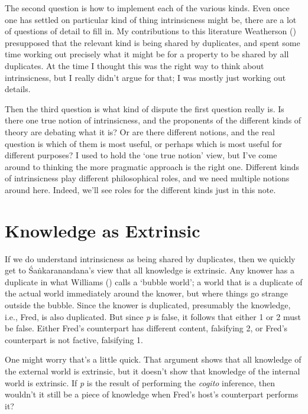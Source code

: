 \documentclass[
  11pt,
  letterpaper,
  DIV=11,
  numbers=noendperiod,
  twoside]{scrartcl}
\begin{document}
The second question is how to implement each of the various kinds. Even
once one has settled on particular kind of thing intrinsicness might be,
there are a lot of questions of detail to fill in. My contributions to
this literature Weatherson ()
presupposed that the relevant kind is being shared by duplicates, and
spent some time working out precisely what it might be for a property to
be shared by all duplicates. At the time I thought this was the right
way to think about intrinsicness, but I really didn't argue for that; I
was mostly just working out details.

Then the third question is what kind of dispute the first question
really is. Is there one true notion of intrinsicness, and the proponents
of the different kinds of theory are debating what it is? Or are there
different notions, and the real question is which of them is most
useful, or perhaps which is most useful for different purposes? I used
to hold the `one true notion' view, but I've come around to thinking the
more pragmatic approach is the right one. Different kinds of
intrinsicness play different philosophical roles, and we need multiple
notions around here. Indeed, we'll see roles for the different kinds
just in this note.

\section{Knowledge as Extrinsic}\label{knowledge-as-extrinsic}

If we do understand intrinsicness as being shared by duplicates, then we
quickly get to Śaṅkaranandana's view that all knowledge is extrinsic.
Any knower has a duplicate in what Williams
() calls a `bubble world'; a world that
is a duplicate of the actual world immediately around the knower, but
where things go strange outside the bubble. Since the knower is
duplicated, presumably the knowledge, i.e., Fred, is also duplicated.
But since \emph{p} is false, it follows that either 1 or 2 must be
false. Either Fred's counterpart has different content, falsifying 2, or
Fred's counterpart is not factive, falsifying 1.

One might worry that's a little quick. That argument shows that all
knowledge of the external world is extrinsic, but it doesn't show that
knowledge of the internal world is extrinsic. If \emph{p} is the result
of performing the \emph{cogito} inference, then wouldn't it still be a
piece of knowledge when Fred's host's counterpart performs it?
\end{document}

